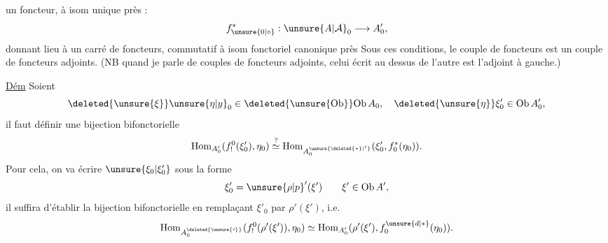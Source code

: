   un foncteur,  à isom unique près :
\[
 f_{\unsure{0|\circ}}^*:\unsure{A|\mathcal{A}}_0\longrightarrow A'_0,
\]
donnant lieu à un carré de foncteurs, commutatif à isom fonctoriel canonique près
Sous ces conditions, le couple de foncteurs
est un couple de foncteurs adjoints. (NB quand je parle de couples de foncteurs adjoints, celui écrit au dessus de l'autre est l'adjoint à gauche.)

\uline{Dém} Soient
\[
 \deleted{\unsure{\xi}}\unsure{\eta|y}_0\in\deleted{\unsure{\mathrm{Ob}}}\mathrm{Ob}\,A_0,\quad \deleted{\unsure{\eta}}\xi'_0\in\mathrm{Ob}\,A'_0,
\]
il faut définir une bijection bifonctorielle
\[
 \mathrm{Hom}_{A'_0}(f_!^0(\xi'_0),\eta_0)\overset{?}{\simeq}
 \mathrm{Hom}_{A^{\unsure{\deleted{*}|'}}_0}(\xi'_0,f_0^*(\eta_0)).
\]
Pour cela, on va écrire $\unsure{\xi_0|\xi'_0}$ sous la forme
\[
 \xi'_0=\unsure{\rho|p}'(\xi')\qquad \xi'\in\mathrm{Ob}\,A',
\]
il suffira d'établir la bijection bifonctorielle en remplaçant $\xi'_0$ par $\rho'(\xi')$, i.e.
\[
 \mathrm{Hom}_{A^{\deleted{\unsure{\prime}}}_0}(f_!^0(\rho'(\xi')),\eta_0)\simeq
 \mathrm{Hom}_{A'_0}(\rho'(\xi'),f_0^{\unsure{d|*}}(\eta_0)).
\]
